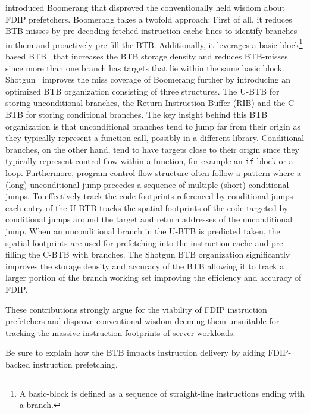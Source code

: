 \documentclass[../main.tex]{subfiles}
\begin{document}
\begin{refsection}
\textcite{kumar17_boomer} introduced Boomerang that disproved the
conventionally held wisdom about FDIP prefetchers. Boomerang takes a
twofold approach: First of all, it reduces BTB misses by pre-decoding
fetched instruction cache lines to identify branches in them and
proactively pre-fill the BTB. Additionally,
it leverages a basic-block\footnote{A basic-block is defined as a
  sequence of straight-line instructions ending with a branch.} based
BTB~\cite{yeh92_compr_instr_fetch_mechan_for} that increases the BTB
storage density and reduces BTB-misses since more than one branch has
targets that lie within the same basic
block. Shotgun~\cite{kumar18_blast_throug_front_end_bottl_with_shotg,kumar20_shoot_down_server_front_end_bottl}
improves the miss coverage of Boomerang further by introducing an
optimized BTB organization consisting of three structures. The U-BTB
for storing unconditional branches, the Return Instruction Buffer
(RIB) and the C-BTB for storing conditional branches. The key insight
behind this BTB organization is that unconditional branches tend to
jump far from their origin as they typically represent a function
call, possibly in a different library. Conditional branches, on the
other hand, tend to have targets close to their origin since they
typically represent control flow within a function, for example an
\texttt{if} block or a loop. Furthermore, program control flow structure often follow a pattern where a (long) unconditional jump precedes a sequence of multiple (short) conditional jumps. To effectively track the code footprints referenced by conditional jumps each entry of the U-BTB tracks the spatial footprints of the code targeted by conditional jumps around the target and return addresses of the unconditional jump. When an unconditional branch in the U-BTB is predicted taken, the spatial footprints are used for prefetching into the instruction cache and pre-filling the C-BTB with branches. The Shotgun BTB organization significantly improves the storage density and accuracy of the BTB allowing it to track a larger portion of the branch working set improving the efficiency and accuracy of FDIP.

These contributions strongly argue for the viability of FDIP instruction prefetchers and disprove conventional wisdom deeming them unsuitable for tracking the massive instruction footprints of server workloads. 



Be sure to explain how the BTB impacts instruction delivery by aiding FDIP-backed instruction prefetching.




\end{refsection}
\end{document}
